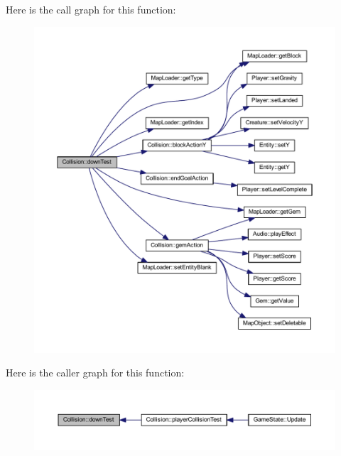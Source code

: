 Here is the call graph for this function\+:
\nopagebreak
\begin{figure}[H]
\begin{center}
\leavevmode
\includegraphics[width=350pt]{class_collision_a7c33a20a9c111630eeb8f0202605161e_cgraph}
\end{center}
\end{figure}




Here is the caller graph for this function\+:
\nopagebreak
\begin{figure}[H]
\begin{center}
\leavevmode
\includegraphics[width=350pt]{class_collision_a7c33a20a9c111630eeb8f0202605161e_icgraph}
\end{center}
\end{figure}



